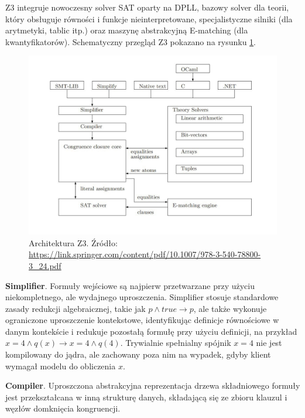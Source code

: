 Z3 integruje nowoczesny solver SAT oparty na DPLL, bazowy solver dla teorii, który obsługuje równości i funkcje nieinterpretowane, specjalistyczne silniki (dla arytmetyki, tablic itp.) oraz maszynę abstrakcyjną E-matching (dla kwantyfikatorów). Schematyczny przegląd Z3 pokazano na rysunku \ref{fig:z3}.		

\begin{figure}[htbp]
	\centering
	\begin{minipage}{\textwidth}
		\includegraphics[width=\textwidth]{./figures/z3_architecture}
		\caption{Architektura Z3. Źródło: \url{https://link.springer.com/content/pdf/10.1007/978-3-540-78800-3_24.pdf}}
		\label{fig:z3}
	\end{minipage}
\end{figure}

\textbf{Simplifier}. Formuły wejściowe są najpierw przetwarzane przy użyciu niekompletnego, ale wydajnego uproszczenia. Simplifier stosuje standardowe zasady redukcji algebraicznej, takie jak $p \land true \to p$, ale także wykonuje ograniczone uproszczenie kontekstowe, identyfikując definicje równościowe w danym kontekście i redukuje pozostałą formułę przy użyciu definicji, na przykład $x = 4 \land q(x) \to x = 4 \land q(4)$. Trywialnie spełnialny spójnik $x = 4$ nie jest kompilowany do jądra, ale zachowany poza nim na wypadek, gdyby klient wymagał modelu do obliczenia $x$.

\textbf{Compiler}. Uproszczona abstrakcyjna reprezentacja drzewa składniowego formuły jest przekształcana w inną strukturę danych, składającą się ze zbioru klauzul i węzłów domknięcia kongruencji.

